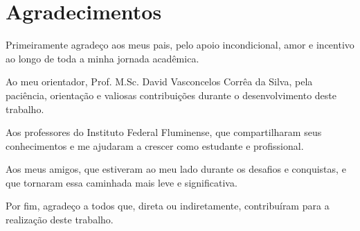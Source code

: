 \documentclass[
	12pt,				%
	openright,			%
	oneside,			%
	a4paper,			%
	english,			%
	french,				%
	spanish,			%
	brazil,				%
	]{abntex2}
\begin{document}
\chapter*{Agradecimentos}

Primeiramente agradeço aos meus pais, pelo apoio incondicional, amor e incentivo ao longo de toda a minha jornada acadêmica.

Ao meu orientador, Prof. M.Sc. David Vasconcelos Corrêa da Silva, pela paciência, orientação e valiosas contribuições durante o desenvolvimento deste trabalho.

Aos professores do Instituto Federal Fluminense, que compartilharam seus conhecimentos e me ajudaram a crescer como estudante e profissional.

Aos meus amigos, que estiveram ao meu lado durante os desafios e conquistas, e que tornaram essa caminhada mais leve e significativa.

Por fim, agradeço a todos que, direta ou indiretamente, contribuíram para a realização deste trabalho.
\cleardoublepage




\listoffigures*
\cleardoublepage
\end{document}
